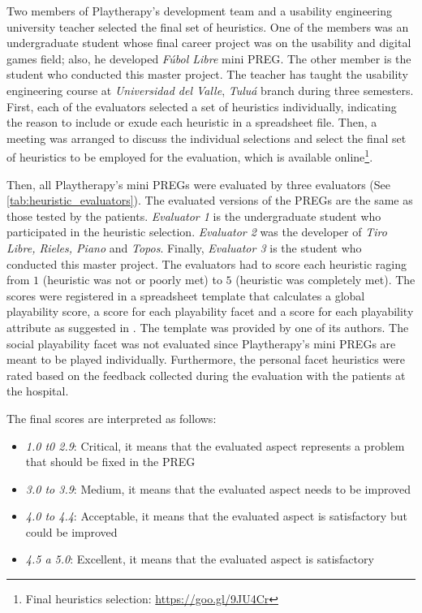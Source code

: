Two members of Playtherapy's development team and a usability engineering university teacher selected the final set of heuristics. One of the members was an undergraduate student whose final career project was on the usability and digital games field; also, he developed \textit{F\'ubol Libre} mini \ac{PREG}. The other member is the student who conducted this master project. The teacher has taught the usability engineering course at \textit{Universidad del Valle}, \textit{Tulu\'a} branch during three semesters. First, each of the evaluators selected a set of heuristics individually, indicating the reason to include or exude each heuristic in a spreadsheet file. Then, a meeting was arranged to discuss the individual selections and select the final set of heuristics to be employed for the evaluation, which is available online\footnote{Final heuristics selection: \url{https://goo.gl/9JU4Cr}}.

Then, all Playtherapy's mini \acp{PREG} were evaluated by three evaluators (See \autoref{tab:heuristic_evaluators}). The evaluated versions of the \acp{PREG} are the same as those tested by the patients. \textit{Evaluator 1} is the undergraduate student who participated in the heuristic selection. \textit{Evaluator 2} was the developer of \textit{Tiro Libre, Rieles, Piano} and \textit{Topos}. Finally, \textit{Evaluator 3} is the student who conducted this master project. The evaluators had to score each heuristic raging from $1$ (heuristic was not or poorly met) to $5$ (heuristic was completely met). The scores were registered in a spreadsheet template that calculates a global playability score, a score for each playability facet and a score for each playability attribute as suggested in \autocite{Sanchez2012}. The template was provided by one of its authors. The social playability facet was not evaluated since Playtherapy's mini \acp{PREG} are meant to be played individually. Furthermore, the personal facet heuristics were rated based on the feedback collected during the evaluation with the patients at the hospital. 

The final scores are interpreted as follows:

\begin{itemize}
    \item \emph{1.0 t0 2.9}: Critical, it means that the evaluated aspect represents a problem that should be fixed in the \ac{PREG}
    \item \emph{3.0 to 3.9}: Medium, it means that the evaluated aspect needs to be improved 
    \item \emph{4.0 to 4.4}: Acceptable, it means that the evaluated aspect is satisfactory but could be improved
    \item \emph{4.5 a 5.0}: Excellent, it means that the evaluated aspect is satisfactory
\end{itemize}

